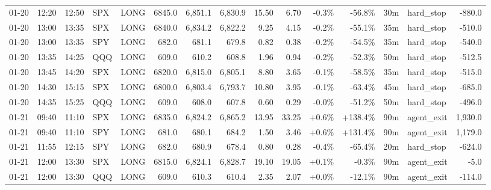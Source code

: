 \documentclass[11pt,a4paper,twoside]{article}
\begin{document}
\begin{landscape}
\begin{center}
\begin{longtable}{>{\color{txtmain}}l l l l l r r r r r r r r >{\color{txtmain}}l r}
01-20 & 12:20 & 12:50 & SPX & LONG & 6845.0 & 6,851.1 & 6,830.9 & 15.50 & 6.70 & \textcolor{lossred}{-0.3\%} & \textcolor{lossred}{-56.8\%} & 30m & hard\_stop & \textcolor{lossred}{-880.0} \\
01-20 & 13:00 & 13:35 & SPX & LONG & 6840.0 & 6,834.2 & 6,822.2 & 9.25 & 4.15 & \textcolor{lossred}{-0.2\%} & \textcolor{lossred}{-55.1\%} & 35m & hard\_stop & \textcolor{lossred}{-510.0} \\
01-20 & 13:00 & 13:35 & SPY & LONG & 682.0 & 681.1 & 679.8 & 0.82 & 0.38 & \textcolor{lossred}{-0.2\%} & \textcolor{lossred}{-54.5\%} & 35m & hard\_stop & \textcolor{lossred}{-540.0} \\
01-20 & 13:35 & 14:25 & QQQ & LONG & 609.0 & 610.2 & 608.8 & 1.96 & 0.94 & \textcolor{lossred}{-0.2\%} & \textcolor{lossred}{-52.3\%} & 50m & hard\_stop & \textcolor{lossred}{-512.5} \\
01-20 & 13:45 & 14:20 & SPX & LONG & 6820.0 & 6,815.0 & 6,805.1 & 8.80 & 3.65 & \textcolor{lossred}{-0.1\%} & \textcolor{lossred}{-58.5\%} & 35m & hard\_stop & \textcolor{lossred}{-515.0} \\
01-20 & 14:30 & 15:15 & SPX & LONG & 6800.0 & 6,803.4 & 6,793.7 & 10.80 & 3.95 & \textcolor{lossred}{-0.1\%} & \textcolor{lossred}{-63.4\%} & 45m & hard\_stop & \textcolor{lossred}{-685.0} \\
01-20 & 14:35 & 15:25 & QQQ & LONG & 609.0 & 608.0 & 607.8 & 0.60 & 0.29 & \textcolor{lossred}{-0.0\%} & \textcolor{lossred}{-51.2\%} & 50m & hard\_stop & \textcolor{lossred}{-496.0} \\
01-21 & 09:40 & 11:10 & SPX & LONG & 6835.0 & 6,824.2 & 6,865.2 & 13.95 & 33.25 & \textcolor{wingreen}{+0.6\%} & \textcolor{wingreen}{+138.4\%} & 90m & agent\_exit & \textcolor{wingreen}{1,930.0} \\
01-21 & 09:40 & 11:10 & SPY & LONG & 681.0 & 680.1 & 684.2 & 1.50 & 3.46 & \textcolor{wingreen}{+0.6\%} & \textcolor{wingreen}{+131.4\%} & 90m & agent\_exit & \textcolor{wingreen}{1,179.0} \\
01-21 & 11:55 & 12:15 & SPY & LONG & 682.0 & 680.9 & 678.4 & 0.80 & 0.28 & \textcolor{lossred}{-0.4\%} & \textcolor{lossred}{-65.4\%} & 20m & hard\_stop & \textcolor{lossred}{-624.0} \\
01-21 & 12:00 & 13:30 & SPX & LONG & 6815.0 & 6,824.1 & 6,828.7 & 19.10 & 19.05 & \textcolor{wingreen}{+0.1\%} & \textcolor{lossred}{-0.3\%} & 90m & agent\_exit & \textcolor{lossred}{-5.0} \\
01-21 & 12:00 & 13:30 & QQQ & LONG & 609.0 & 610.3 & 610.4 & 2.35 & 2.07 & \textcolor{wingreen}{+0.0\%} & \textcolor{lossred}{-12.1\%} & 90m & agent\_exit & \textcolor{lossred}{-114.0} \\

\end{longtable}
\end{center}
\end{landscape}
\end{document}
